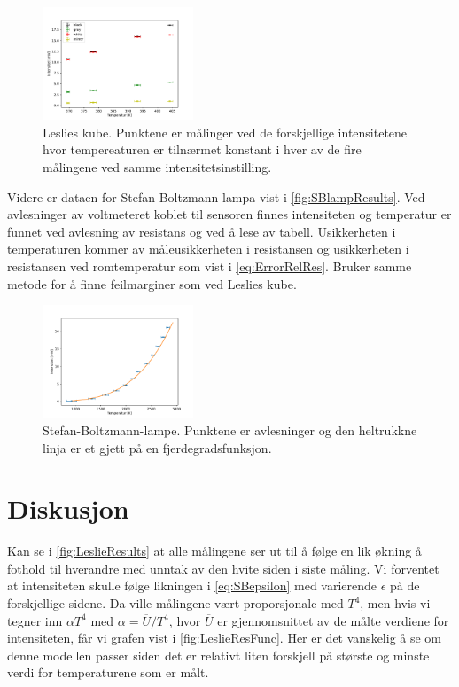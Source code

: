 \begin{figure}
  \centering
  \includegraphics[width=0.4\textwidth]{../code/LC.pdf}
  \caption{Leslies kube. Punktene er målinger ved de forskjellige intensitetene hvor tempereaturen er tilnærmet konstant i hver av de fire målingene ved samme intensitetsinstilling.}
  \label{fig:LeslieResults}
\end{figure}

Videre er dataen for Stefan-Boltzmann-lampa vist i \autoref{fig:SBlampResults}. Ved avlesninger av voltmeteret koblet til sensoren finnes intensiteten og temperatur er funnet ved avlesning av resistans og ved å lese av tabell. Usikkerheten i temperaturen kommer av måleusikkerheten i resistansen og usikkerheten i resistansen ved romtemperatur som vist i \eqref{eq:ErrorRelRes}. Bruker samme metode for å finne feilmarginer som ved Leslies kube.

\begin{figure}
  \centering
  \includegraphics[width=0.4\textwidth]{../code/SB_lamp.pdf}
  \caption{Stefan-Boltzmann-lampe. Punktene er avlesninger og den heltrukkne linja er et gjett på en fjerdegradsfunksjon.}
  \label{fig:SBlampResults}
\end{figure}


\section{Diskusjon}
Kan se i \autoref{fig:LeslieResults} at alle målingene ser ut til å følge en lik økning å fothold til hverandre med unntak av den hvite siden i siste måling. Vi forventet at intensiteten skulle følge likningen i \eqref{eq:SBepsilon} med varierende $\epsilon$ på de forskjellige sidene. Da ville målingene vært proporsjonale med $T^{4}$, men hvis vi tegner inn $\alpha T^{4}$ med $\alpha=\overline{U} / T^{4}$, hvor $\overline{U}$ er gjennomsnittet av de målte verdiene for intensiteten, får vi grafen vist i \autoref{fig:LeslieResFunc}. Her er det vanskelig å se om denne modellen passer siden det er relativt liten forskjell på største og minste verdi for temperaturene som er målt.

